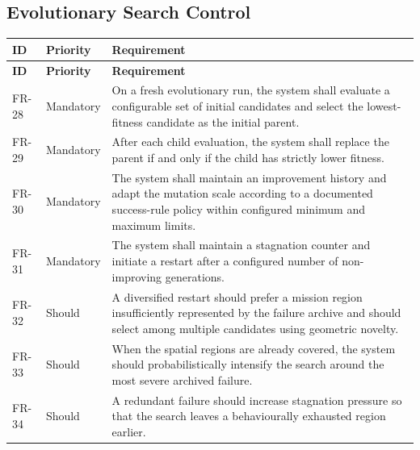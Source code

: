 \documentclass[11pt,a4paper,openany]{report}
\begin{document}
\subsection{Evolutionary Search Control}
\begin{longtable}{L{1.7cm} L{2.1cm} L{10.8cm}}
\toprule
\textbf{ID} & \textbf{Priority} & \textbf{Requirement}\\
\midrule
\endfirsthead
\toprule
\textbf{ID} & \textbf{Priority} & \textbf{Requirement}\\
\midrule
\endhead
FR-28 & Mandatory & On a fresh evolutionary run, the system shall evaluate a configurable set of initial candidates and select the lowest-fitness candidate as the initial parent.\\
FR-29 & Mandatory & After each child evaluation, the system shall replace the parent if and only if the child has strictly lower fitness.\\
FR-30 & Mandatory & The system shall maintain an improvement history and adapt the mutation scale according to a documented success-rule policy within configured minimum and maximum limits.\\
FR-31 & Mandatory & The system shall maintain a stagnation counter and initiate a restart after a configured number of non-improving generations.\\
FR-32 & Should & A diversified restart should prefer a mission region insufficiently represented by the failure archive and should select among multiple candidates using geometric novelty.\\
FR-33 & Should & When the spatial regions are already covered, the system should probabilistically intensify the search around the most severe archived failure.\\
FR-34 & Should & A redundant failure should increase stagnation pressure so that the search leaves a behaviourally exhausted region earlier.\\
\bottomrule
\end{longtable}
\end{document}
